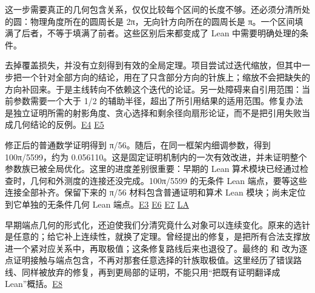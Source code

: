 这一步需要真正的几何包含关系，仅仅比较每个区间的长度不够。还必须分清所处的圆：物理角度所在的圆周长是 2π，无向针方向所在的圆周长是 π。一个区间填满了后者，不等于填满了前者。这些区别后来都变成了 Lean 中需要明确处理的条件。

去掉覆盖损失，并没有立刻得到有效的全局定理。项目尝试过迭代缩放，但其中一步把一个针对全部方向的结论，用在了只含部分方向的针族上；缩放不会把缺失的方向补回来。于是主线转向不依赖这个迭代的论证。另一处障碍来自引用范围：当前参数需要一个大于 1/2 的辅助半径，超出了所引用结果的适用范围。修复办法是独立证明所需的射影角度、贪心选择和剩余径向扇形论证，而不是把引用失败当成几何结论的反例。\href{https://github.com/subfish-zhou/star-shaped-kakeya-lean/blob/6432d8eb33cc2093ed5ca1f5e63390e4bf065fd0/history-sources/E4-SUPERSEDED-ROUND-1-PI56-AUDIT.md}{E4} \href{https://github.com/subfish-zhou/star-shaped-kakeya-lean/blob/6432d8eb33cc2093ed5ca1f5e63390e4bf065fd0/history-sources/E5-ROUND-2-LI-THEOREM-AUDIT.md}{E5}

修正后的普通数学证明得到 π/56。随后，在同一框架内细调参数，得到 100π/5599，约为 \allowbreak{}0.056110。这是固定证明机制内的一次有效改进，并未证明整个参数族已被全局优化。这里的进度差别很重要：早期的 Lean 算术模块已经通过检查时，几何和外测度的连接还没完成。100π/5599 的无条件 Lean 端点，要等这些连接全部补齐。保留下来的 π/56 材料包含普通证明和算术 Lean 模块；尚未定位到它单独的无条件几何 Lean 端点。\href{https://github.com/subfish-zhou/star-shaped-kakeya-lean/blob/6432d8eb33cc2093ed5ca1f5e63390e4bf065fd0/history-sources/E3-PI56-INDEPENDENT-PROOF.md}{E3} \href{https://github.com/subfish-zhou/star-shaped-kakeya-lean/blob/6432d8eb33cc2093ed5ca1f5e63390e4bf065fd0/history-sources/E6-STRONGER-100-OVER-5599-PROOF.md}{E6} \href{https://github.com/subfish-zhou/star-shaped-kakeya-lean/blob/6432d8eb33cc2093ed5ca1f5e63390e4bf065fd0/history-sources/E7-ROUND-4-STRONGER-CERTIFICATE.md}{E7} \href{https://github.com/subfish-zhou/star-shaped-kakeya-lean/blob/6432d8eb33cc2093ed5ca1f5e63390e4bf065fd0/audits/historical-lean-audit.md}{LA}

早期端点几何的形式化，还迫使我们分清究竟什么对象可以连续变化。原来的选针是任意的；给它补上连续性，就换了定理。曾经提出的修复，是把所有合法支撑放进一个紧对应关系中，再取极值；这条修复路线后来也退役了。最终的  和  改为逐点证明接触与端点包含，不再对那套任意选择的针族取极值。这里经历了错误路线、同样被放弃的修复，再到更局部的证明，不能只用``把既有证明翻译成 Lean''概括。\href{https://github.com/subfish-zhou/star-shaped-kakeya-lean/blob/6432d8eb33cc2093ed5ca1f5e63390e4bf065fd0/history-sources/E8-ENDPOINT-FATALITY.md}{E8}

